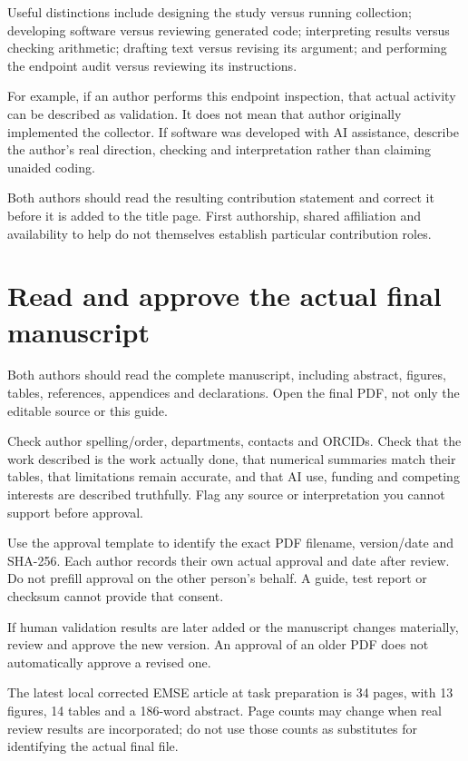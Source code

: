 \documentclass[11pt,a4paper]{article}
\begin{document}
Useful distinctions include designing the study versus running collection; developing software versus reviewing generated code; interpreting results versus checking arithmetic; drafting text versus revising its argument; and performing the endpoint audit versus reviewing its instructions.


For example, if an author performs this endpoint inspection, that actual activity can be described as validation. It does not mean that author originally implemented the collector. If software was developed with AI assistance, describe the author's real direction, checking and interpretation rather than claiming unaided coding.


Both authors should read the resulting contribution statement and correct it before it is added to the title page. First authorship, shared affiliation and availability to help do not themselves establish particular contribution roles.


\section{Read and approve the actual final manuscript}


Both authors should read the complete manuscript, including abstract, figures, tables, references, appendices and declarations. Open the final PDF, not only the editable source or this guide.


Check author spelling/order, departments, contacts and ORCIDs. Check that the work described is the work actually done, that numerical summaries match their tables, that limitations remain accurate, and that AI use, funding and competing interests are described truthfully. Flag any source or interpretation you cannot support before approval.


Use the approval template to identify the exact PDF filename, version/date and SHA-256. Each author records their own actual approval and date after review. Do not prefill approval on the other person's behalf. A guide, test report or checksum cannot provide that consent.


If human validation results are later added or the manuscript changes materially, review and approve the new version. An approval of an older PDF does not automatically approve a revised one.


The latest local corrected EMSE article at task preparation is 34 pages, with 13 figures, 14 tables and a 186-word abstract. Page counts may change when real review results are incorporated; do not use those counts as substitutes for identifying the actual final file.
\end{document}
